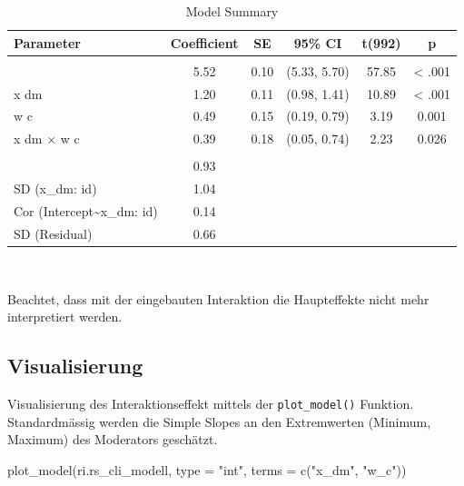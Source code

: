 \documentclass[
  letterpaper,
  DIV=11,
  numbers=noendperiod]{scrreprt}
\newenvironment{Shaded}{\begin{snugshade}}{\end{snugshade}}
\newcommand{\AttributeTok}[1]{\textcolor[rgb]{0.40,0.45,0.13}{#1}}
\newcommand{\FunctionTok}[1]{\textcolor[rgb]{0.28,0.35,0.67}{#1}}
\newcommand{\NormalTok}[1]{\textcolor[rgb]{0.00,0.23,0.31}{#1}}
\newcommand{\StringTok}[1]{\textcolor[rgb]{0.13,0.47,0.30}{#1}}
\begin{document}
\begin{table}
\caption*{
{\large Model Summary}
} 
\fontsize{12.0pt}{14.4pt}\selectfont
\begin{tabular*}{\linewidth}{@{\extracolsep{\fill}}lccccc}
\toprule
Parameter & Coefficient & SE & 95\% CI & t(992) & p \\ 
\midrule\addlinespace[2.5pt]
\multicolumn{6}{l}{{\slshape Fixed Effects }} \\[2.5pt] 
\midrule\addlinespace[2.5pt]
{(Intercept)} & 5.52 & 0.10 & (5.33, 5.70) & 57.85 & < .001 \\ 
{x dm} & 1.20 & 0.11 & (0.98, 1.41) & 10.89 & < .001 \\ 
{w c} & 0.49 & 0.15 & (0.19, 0.79) & 3.19 & 0.001  \\ 
{x dm × w c} & 0.39 & 0.18 & (0.05, 0.74) & 2.23 & 0.026  \\ 
\midrule\addlinespace[2.5pt]
\multicolumn{6}{l}{{\slshape Random Effects }} \\[2.5pt] 
\midrule\addlinespace[2.5pt]
{SD (Intercept: id)} & 0.93 &  &  &  &  \\ 
{SD (x\_dm: id)} & 1.04 &  &  &  &  \\ 
{Cor (Intercept\textasciitilde{}x\_dm: id)} & 0.14 &  &  &  &  \\ 
{SD (Residual)} & 0.66 &  &  &  &  \\ 
\bottomrule
\end{tabular*}
\begin{minipage}{\linewidth}
\\
\end{minipage}
\end{table}

Beachtet, dass mit der eingebauten Interaktion die Haupteffekte nicht
mehr interpretiert werden.

\subsection{Visualisierung}\label{visualisierung-3}

Visualisierung des Interaktionseffekt mittels der \texttt{plot\_model()}
Funktion. Standardmässig werden die Simple Slopes an den Extremwerten
(Minimum, Maximum) des Moderators geschätzt.

\begin{Shaded}
\begin{Highlighting}[]
\FunctionTok{plot\_model}\NormalTok{(ri.rs\_cli\_modell, }\AttributeTok{type =} \StringTok{"int"}\NormalTok{, }\AttributeTok{terms =} \FunctionTok{c}\NormalTok{(}\StringTok{"x\_dm"}\NormalTok{, }\StringTok{"w\_c"}\NormalTok{))}
\end{Highlighting}
\end{Shaded}
\end{document}

